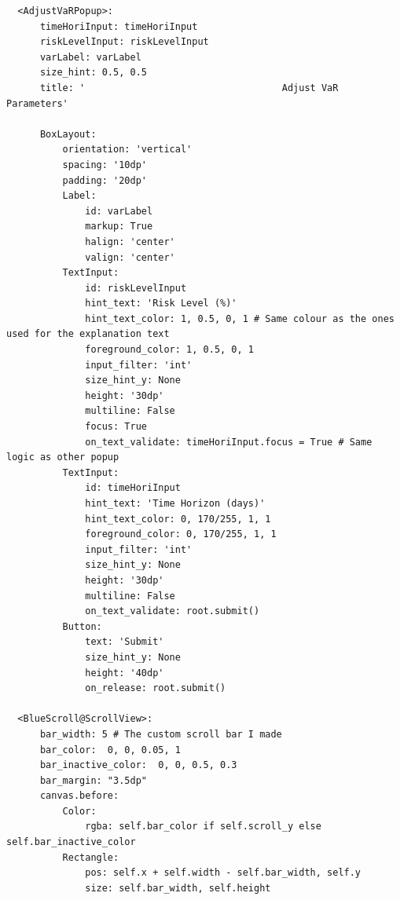 \documentclass{article}
\begin{document}
\begin{verbatim}
  <AdjustVaRPopup>:
      timeHoriInput: timeHoriInput
      riskLevelInput: riskLevelInput
      varLabel: varLabel
      size_hint: 0.5, 0.5
      title: '                                   Adjust VaR Parameters'

      BoxLayout:
          orientation: 'vertical'
          spacing: '10dp'
          padding: '20dp'
          Label:
              id: varLabel
              markup: True
              halign: 'center'
              valign: 'center'
          TextInput:
              id: riskLevelInput
              hint_text: 'Risk Level (%)'
              hint_text_color: 1, 0.5, 0, 1 # Same colour as the ones used for the explanation text
              foreground_color: 1, 0.5, 0, 1
              input_filter: 'int'
              size_hint_y: None
              height: '30dp'
              multiline: False
              focus: True
              on_text_validate: timeHoriInput.focus = True # Same logic as other popup
          TextInput:
              id: timeHoriInput
              hint_text: 'Time Horizon (days)'
              hint_text_color: 0, 170/255, 1, 1
              foreground_color: 0, 170/255, 1, 1
              input_filter: 'int'
              size_hint_y: None
              height: '30dp'
              multiline: False
              on_text_validate: root.submit()
          Button:
              text: 'Submit'
              size_hint_y: None
              height: '40dp'
              on_release: root.submit()

  <BlueScroll@ScrollView>:
      bar_width: 5 # The custom scroll bar I made
      bar_color:  0, 0, 0.05, 1
      bar_inactive_color:  0, 0, 0.5, 0.3
      bar_margin: "3.5dp"
      canvas.before:
          Color:
              rgba: self.bar_color if self.scroll_y else self.bar_inactive_color
          Rectangle:
              pos: self.x + self.width - self.bar_width, self.y
              size: self.bar_width, self.height

\end{verbatim}
\vspace{0.5cm}
\end{document}
